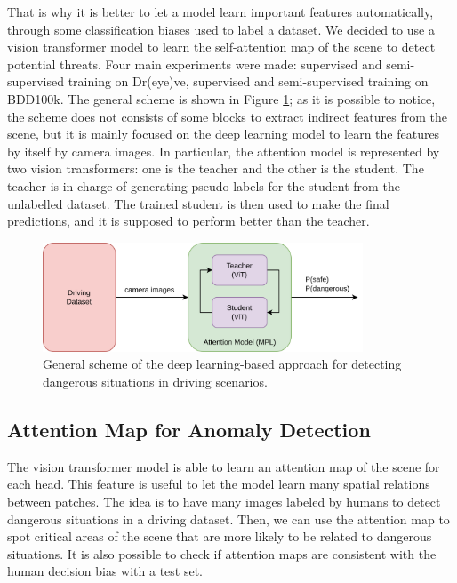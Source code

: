 That is why it is better to let a model learn important features automatically, through 
some classification biases used to label a dataset. We decided to use a vision 
transformer model to learn the self-attention map of the scene to detect 
potential threats.
Four main experiments were made: supervised and semi-supervised training on Dr(eye)ve, 
supervised and semi-supervised training on BDD100k.
The general scheme is shown in Figure \ref{fig:dl_approach_scheme}; as it is 
possible to notice, the scheme does not consists of some blocks to extract 
indirect features from the scene, but it is mainly focused on the deep learning 
model to learn the features by itself by camera images. In particular, the 
attention model is represented by two vision transformers: one is the teacher and 
the other is the student. The teacher is in charge of generating pseudo labels 
for the student from the unlabelled dataset. The trained student is then used 
to make the final predictions, and it is supposed to perform better than the
teacher.
\begin{figure}
\centering
\includegraphics[width=0.85\textwidth]{images/ssl/dl_approach_scheme.png}
\vspace{0.4cm}
\caption[Deep learning-based detection model of dangerous scenarios.]
{General scheme of the deep learning-based approach for detecting
dangerous situations in driving scenarios.}
\label{fig:dl_approach_scheme}
\end{figure}

\subsection{Attention Map for Anomaly Detection}
The vision transformer model is able to learn an attention map of the scene for 
each head. This feature is useful to let the model learn many spatial relations 
between patches. The idea is to have many images labeled by humans to detect 
dangerous situations in a driving dataset. Then, we can use the attention map 
to spot critical areas of the scene that are more likely to be related to 
dangerous situations.
It is also possible to check if attention maps are consistent with the human 
decision bias with a test set.

